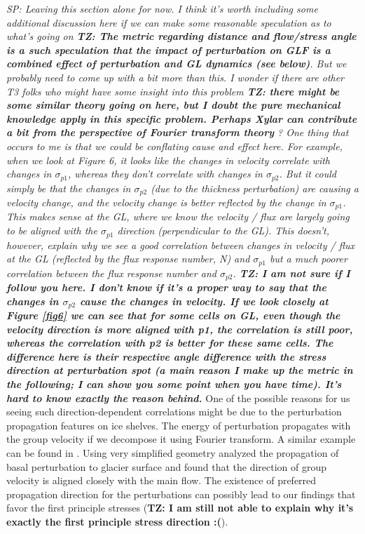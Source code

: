 \documentclass[review,oneside]{igs}
\begin{document}
\textit{SP: Leaving this section alone for now. I think it's worth including some additional discussion here if we can make some reasonable speculation as to what's going on \textbf{TZ: The metric regarding distance and flow/stress angle is a such speculation that the impact of perturbation on GLF is a combined effect of perturbation and GL dynamics (see below)}. But we probably need to come up with a bit more than this. I wonder if there are other T3 folks who might have some insight into this problem \textbf{TZ: there might be some similar theory going on here, but I doubt the pure mechanical knowledge apply in this specific problem. Perhaps Xylar can contribute a bit from the perspective of Fourier transform theory} ? One thing that occurs to me is that we could be conflating cause and effect here. For example, when we look at Figure 6, it looks like the changes in velocity correlate with changes in $\sigma_{p1}$, whereas they don't correlate with changes in $\sigma_{p2}$. But it could simply be that the changes in $\sigma_{p2}$ (due to the thickness perturbation) are causing a velocity change, and the velocity change is better reflected by the change in $\sigma_{p1}$. This makes sense at the GL, where we know the velocity / flux are largely going to be aligned with the $\sigma_{p1}$ direction (perpendicular to the GL). This doesn't, however, explain why we see a good correlation between changes in velocity / flux at the GL (reflected by the flux response number, N) and $\sigma_{p1}$ but a much poorer correlation between the flux response number and $\sigma_{p2}$. \textbf{TZ: I am not sure if I follow you here. I don't know if it's a proper way to say that the changes in $\sigma_{p2}$ cause the changes in velocity. If we look closely at Figure \ref{fig6} we can see that for some cells on GL, even though the velocity direction is more aligned with p1, the correlation is still poor, whereas the correlation with p2 is better for these same cells. The difference here is their respective angle difference with the stress direction at perturbation spot (a main reason I make up the metric in the following; I can show you some point when you have time). It's hard to know exactly the reason behind.}} One of the possible reasons for us seeing such direction-dependent correlations might be due to the perturbation propagation features on ice shelves. The energy of perturbation propagates with the group velocity if we decompose it using Fourier transform. A similar example can be found in \citep{gudmundsson2003}. Using very simplified geometry \cite{gudmundsson2003} analyzed the propagation of basal perturbation to glacier surface and found that the direction of group velocity is aligned closely with the main flow. The existence of preferred propagation direction for the perturbations can possibly lead to our findings that favor the first principle stresses (\textbf{TZ: I am still not able to explain why it's exactly the first principle stress direction :(}). 
\end{document}
